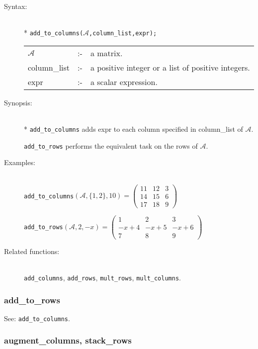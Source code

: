 \begin{description}
  \item[Syntax:]\mbox{}\\*
\texttt{add\_to\_columns($\mathcal{A}$,column\_list,expr);}\\[2mm]
\begin{tabular}{l l l}
$\mathcal{A}$   &:-& a matrix. \\
column\_list &:-& a positive integer or a list of positive integers. \\
expr        &:-& a scalar expression.
\end{tabular}

\item[Synopsis:]\mbox{}\\*
\texttt{add\_to\_columns} adds expr to each column specified in
column\_list of $\mathcal{A}$.

\texttt{add\_to\_rows} performs the equivalent task on the rows of
$\mathcal{A}$.

\item[Examples:]\mbox{}\\
  \texttt{add\_to\_columns}\((\mathcal{A},\{1,2\},10)  =
  \begin{pmatrix} 11 & 12 & 3 \\ 14 & 15 & 6 \\ 17 & 18 & 9 \end{pmatrix}\)

  \texttt{add\_to\_rows}\((\mathcal{A},2,-x)  =
  \begin{pmatrix} 1 & 2 & 3 \\ -x+4 & -x+5 & -x+6 \\ 7 & 8 & 9 \end{pmatrix}\)

\item[Related functions:]\mbox{}\\
\texttt{add\_columns}, \texttt{add\_rows}, \texttt{mult\_rows},
\texttt{mult\_columns}.
\end{description}

\subsubsection{add\_to\_rows}
\label{linalg:add_to_rows}
\hypertarget{operator:ADD_TO_ROWS}{}

See: \texttt{add\_to\_columns}.


\subsubsection{augment\_columns, stack\_rows}
\label{linalg:augment_columns}
\hypertarget{operator:AUGMENT_COLUMNS}{}

